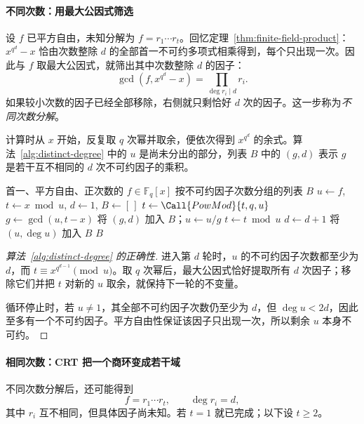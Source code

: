 \documentclass[lang=cn,a4paper,fontset=none,zihao=false,10pt,openany,twoside]{beautybook}
\numberwithin{algorithm}{chapter}
\begin{document}
\paragraph{不同次数：用最大公因式筛选}
设 $f$ 已平方自由，未知分解为 $f=r_1\cdots r_t$。回忆定理~\ref{thm:finite-field-product}：$x^{q^d}-x$ 恰由次数整除 $d$ 的全部首一不可约多项式相乘得到，每个只出现一次。因此与 $f$ 取最大公因式，就筛出其中次数整除 $d$ 的因子：
\[
 \gcd(f,x^{q^d}-x)=\prod_{\deg r_i\mid d}r_i.
\]
如果较小次数的因子已经全部移除，右侧就只剩恰好 $d$ 次的因子。这一步称为\emph{不同次数分解}。

计算时从 $x$ 开始，反复取 $q$ 次幂并取余，便依次得到 $x^{q^d}$ 的余式。算法~\ref{alg:distinct-degree} 中的 $u$ 是尚未分出的部分，列表 $B$ 中的 $(g,d)$ 表示 $g$ 是若干互不相同的 $d$ 次不可约因子的乘积。
\begin{algorithm}[htbp]
\caption{不同次数分解}\label{alg:distinct-degree}
\begin{algorithmic}[1]
\Require 首一、平方自由、正次数的 $f\in\mathbb F_q[x]$
\Ensure 按不可约因子次数分组的列表 $B$
 \State $u\gets f$, $t\gets x\bmod u$, $d\gets1$, $B\gets[\,]$
  \State $t\gets\Call{PowMod}{t,q,u}$
  \State $g\gets\gcd(u,t-x)$
   \State 将 $(g,d)$ 加入 $B$；$u\gets u/g$
    \State $t\gets t\bmod u$
   \EndIf
  \EndIf
  \State $d\gets d+1$
 \EndWhile
  \State 将 $(u,\deg u)$ 加入 $B$
 \EndIf
 \State \Return $B$
\EndFunction
\end{algorithmic}
\end{algorithm}
\begin{proof}[算法~\ref{alg:distinct-degree} 的正确性]
进入第 $d$ 轮时，$u$ 的不可约因子次数都至少为 $d$，而 $t\equiv x^{q^{d-1}}\pmod u$。取 $q$ 次幂后，最大公因式恰好提取所有 $d$ 次因子；移除它们并把 $t$ 对新的 $u$ 取余，就保持下一轮的不变量。

循环停止时，若 $u\ne1$，其全部不可约因子次数仍至少为 $d$，但 $\deg u<2d$，因此至多有一个不可约因子。平方自由性保证该因子只出现一次，所以剩余 $u$ 本身不可约。
\end{proof}

\paragraph{相同次数：CRT 把一个商环变成若干域}
不同次数分解后，还可能得到
\[
 f=r_1\cdots r_t,\qquad \deg r_i=d,
\]
其中 $r_i$ 互不相同，但具体因子尚未知。若 $t=1$ 就已完成；以下设 $t\ge2$。
\end{document}
